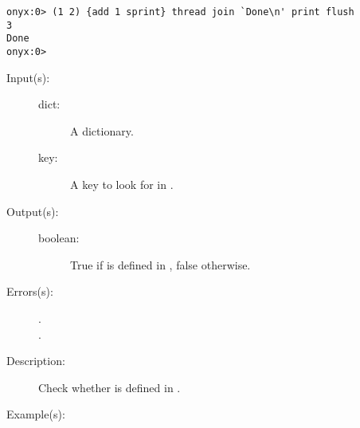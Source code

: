\begin{description}
\begin{description}
\begin{verbatim}
onyx:0> (1 2) {add 1 sprint} thread join `Done\n' print flush
3
Done
onyx:0>
		\end{verbatim}
	\end{description}
\label{systemdict:known}
\item[{\onyxop{dict key}{known}{boolean}}: ]
	\begin{description}\item[]
	\item[Input(s): ]
		\begin{description}\item[]
		\item[dict: ]
			A dictionary.
		\item[key: ]
			A key to look for in .
		\end{description}
	\item[Output(s): ]
		\begin{description}\item[]
		\item[boolean: ]
			True if  is defined in , false
			otherwise.
		\end{description}
	\item[Errors(s): ]
		\begin{description}\item[]
		\item[.]
		\item[.]
		\end{description}
	\item[Description: ]
		Check whether  is defined in .
	\item[Example(s): ]\begin{verbatim}


\end{verbatim}
\end{description}
\end{description}
